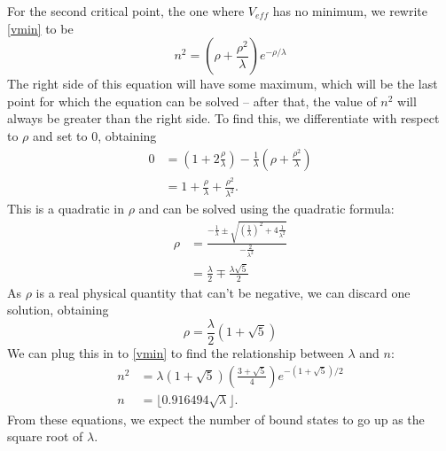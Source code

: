 \documentclass[12pt,twoside]{reedthesis}
\begin{document}
For the second critical point, the one where $V_{eff}$ has no minimum, we rewrite \eqref{vmin} to be
\begin{equation}
n^2 = \left( \rho + \frac{\rho^2}{\lambda} \right) e^{-\rho/\lambda}
\end{equation}
The right side of this equation will have some maximum, which will be the last point for which the equation can be solved -- after that, the value of $n^2$ will always be greater than the right side. To find this, we differentiate with respect to $\rho$ and set to 0, obtaining
\begin{align}
0 &= (1+2 \frac{\rho}{\lambda}) - \frac{1}{\lambda}(\rho + \frac{\rho^2}{\lambda}) \\
&= 1 + \frac{\rho}{\lambda} + \frac{\rho^2}{\lambda^2}\mbox{.}
\end{align}
This is a quadratic in $\rho$ and can be solved using the quadratic formula:
\begin{align}
\rho &= \frac{-\frac{1}{\lambda} \pm \sqrt{\left(\frac{1}{\lambda}\right)^2+4\frac{1}{\lambda^2}}}{-\frac{2}{\lambda^2}} \\
&= \frac{\lambda}{2} \mp \frac{\lambda \sqrt{5}}{2}
\end{align}
As $\rho$ is a real physical quantity that can't be negative, we can discard one solution, obtaining
\begin{equation}
\rho = \frac{\lambda}{2}(1+\sqrt{5})
\end{equation}
We can plug this in to \eqref{vmin} to find the relationship between $\lambda$ and $n$:
\begin{align}
n^2 &= \lambda(1+\sqrt{5})\left(\frac{3+\sqrt{5}}{4}\right)e^{-(1+\sqrt{5})/2} \\
n &= \lfloor 0.916494 \sqrt{\lambda} \rfloor \mbox{.}
\end{align}
From these equations, we expect the number of bound states to go up as the square root of $\lambda$.


%
%
%	
%
%
%
%
\backmatter %
%
\end{document}
